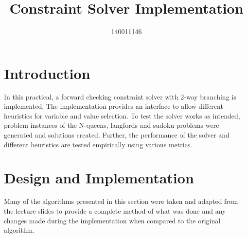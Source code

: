 \documentclass{article}
\title{Constraint Solver Implementation}
\author{140011146}
\begin{document}




\section{Introduction}
In this practical, a forward checking constraint solver with 2-way branching is implemented. The implementation provides an interface to allow different heuristics for variable and value selection. To test the solver works as intended, problem instances of the N-queens, langfords and sudoku problems were generated and solutions created. Further, the performance of the solver and different heuristics are tested empirically using various metrics.

\section{Design and Implementation}
Many of the algorithms presented in this section were taken and adapted from the lecture slides to provide a complete method of what was done and any changes made during the implementation when compared to the original algorithm. 
\end{document}
